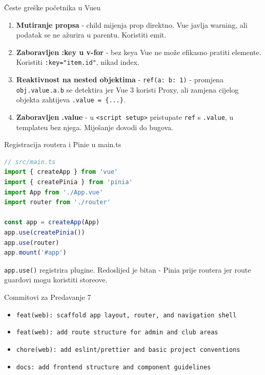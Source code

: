\begin{frame}{Česte greške početnika u Vueu}
\begin{enumerate}
  \item \textbf{Mutiranje propsa} - child mijenja prop direktno. Vue javlja warning, ali podatak se ne ažurira u parentu. Koristiti emit.
  \item \textbf{Zaboravljen :key u v-for} - bez keya Vue ne može efikasno pratiti elemente. Koristiti \texttt{:key="item.id"}, nikad index.
  \item \textbf{Reaktivnost na nested objektima} - \texttt{ref({a: {b: 1}})} - promjena \texttt{obj.value.a.b} se detektira jer Vue 3 koristi Proxy, ali zamjena cijelog objekta zahtijeva \texttt{.value = \{...\}}.
  \item \textbf{Zaboravljen .value} - u \texttt{<script setup>} pristupate \texttt{ref} s \texttt{.value}, u templateu bez njega. Miješanje dovodi do bugova.
\end{enumerate}
\end{frame}

\begin{frame}[fragile,shrink=5]{Registracija routera i Pinie u main.ts}
\begin{lstlisting}[language=typescript]
// src/main.ts
import { createApp } from 'vue'
import { createPinia } from 'pinia'
import App from './App.vue'
import router from './router'

const app = createApp(App)
app.use(createPinia())
app.use(router)
app.mount('#app')
\end{lstlisting}

\vspace{0.4em}
\texttt{app.use()} registrira plugine. Redoslijed je bitan - Pinia prije routera jer route guardovi mogu koristiti storeove.
\end{frame}

\begin{frame}{Commitovi za Predavanje 7}
\begin{itemize}
  \item \texttt{feat(web): scaffold app layout, router, and navigation shell}
  \item \texttt{feat(web): add route structure for admin and club areas}
  \item \texttt{chore(web): add eslint/prettier and basic project conventions}
  \item \texttt{docs: add frontend structure and component guidelines}
\end{itemize}

\vspace{0.4em}
\end{frame}

